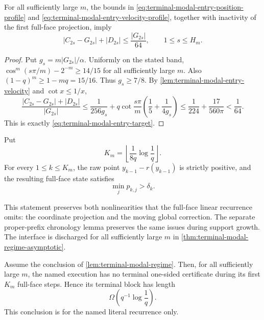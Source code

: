 \begin{lemma}
\label{lem:terminal-modal-profile-implies-quadrature}
For all sufficiently large $m$, the bounds in
\eqref{eq:terminal-modal-entry-position-profile} and
\eqref{eq:terminal-modal-entry-velocity-profile}, together with inactivity
of the first full-face projection, imply
\begin{equation}
 |C_{2s}-G_{2s}|+|D_{2s}|\le\frac{|G_{2s}|}{64},
 \qquad 1\le s\le H_m.
 \label{eq:terminal-modal-entry-target}
\end{equation}
\end{lemma}

\begin{proof}
Put $g_s=m|G_{2s}|/\alpha$.  Uniformly on the stated band,
$\cos^m(s\pi/m)-2^{-m}\ge14/15$ for all sufficiently large $m$.
Also $(1-q)^m\ge1-mq=15/16$.  Thus $g_s\ge7/8$.
By \cref{lem:terminal-modal-entry-velocity} and $\cot x\le1/x$,
\[
 \frac{|C_{2s}-G_{2s}|+|D_{2s}|}{|G_{2s}|}
 \le \frac1{256g_s}
 +q\cot\frac{s\pi}{m}\left(\frac15+\frac1{4g_s}\right)
 \le\frac1{224}+\frac{17}{560\pi}<\frac1{64}.
\]
This is exactly \eqref{eq:terminal-modal-entry-target}.
\end{proof}

\begin{lemma}
\label{lem:terminal-modal-regime}
Put
\begin{equation}
 K_m=\left\lfloor\frac1{8q}\log\frac1q\right\rfloor.
 \label{eq:terminal-modal-horizon}
\end{equation}
For every $1\le k\le K_m$, the raw point
$y_{k-1}-r(y_{k-1})$ is strictly positive, and the resulting full-face state
satisfies
\begin{equation}
 \min_j p_{k,j}>\delta_k.
 \label{eq:terminal-modal-unclipped-target}
\end{equation}
\end{lemma}

This statement preserves both nonlinearities that the full-face linear
recurrence omits: the coordinate projection and the moving global correction.
The separate proper-prefix chronology lemma preserves the same issues during
support growth.  The interface is discharged for all sufficiently large $m$
in \cref{thm:terminal-modal-regime-asymptotic}.

\begin{theorem}
\label{thm:terminal-modal-conditional-log}
Assume the conclusion of \cref{lem:terminal-modal-regime}.
Then, for
all sufficiently large $m$, the named execution has no terminal one-sided
certificate during its first $K_m$ full-face steps.  Hence its terminal block
has length
\begin{equation}
 \Omega\!\left(q^{-1}\log\frac1q\right).
 \label{eq:terminal-modal-conditional-log}
\end{equation}
This conclusion is for the named literal recurrence only.
\end{theorem}

